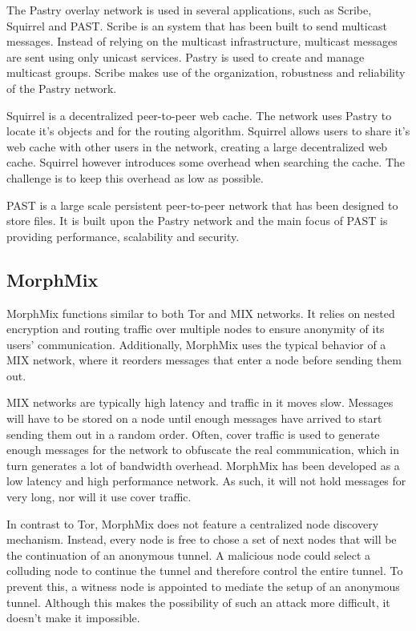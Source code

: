\documentclass{article}
\begin{document}
		The Pastry overlay network is used in several applications, such as Scribe, Squirrel and PAST. Scribe is an system that has been built to send multicast messages. Instead of relying on the multicast infrastructure, multicast messages are sent using only unicast services. Pastry is used to create and manage multicast groups. Scribe makes use of the organization, robustness and reliability of the Pastry network.

		Squirrel is a decentralized peer-to-peer web cache. The network uses Pastry to locate it's objects and for the routing algorithm. Squirrel allows users to share it's web cache with other users in the network, creating a large decentralized web cache. Squirrel however introduces some overhead when searching the cache. The challenge is to keep this overhead as low as possible.

		PAST is a large scale persistent peer-to-peer network that has been designed to store files. It is built upon the Pastry network and the main focus of PAST is providing performance, scalability and security.
			
	\subsection{MorphMix} %
		MorphMix \cite{rennhard2002introducing} functions similar to both Tor and MIX networks. It relies on nested encryption and routing traffic over multiple nodes to ensure anonymity of its users' communication. Additionally, MorphMix uses the typical behavior of a MIX network, where it reorders messages that enter a node before sending them out.
		
		MIX networks are typically high latency and traffic in it moves slow. Messages will have to be stored on a node until enough messages have arrived to start sending them out in a random order. Often, cover traffic is used to generate enough messages for the network to obfuscate the real communication, which in turn generates a lot of bandwidth overhead. MorphMix has been developed as a low latency and high performance network. As such, it will not hold messages for very long, nor will it use cover traffic.
		
		In contrast to Tor, MorphMix does not feature a centralized node discovery mechanism. Instead, every node is free to chose a set of next nodes that will be the continuation of an anonymous tunnel. A malicious node could select a colluding node to continue the tunnel and therefore control the entire tunnel. To prevent this, a witness node is appointed to mediate the setup of an anonymous tunnel. Although this makes the possibility of such an attack more difficult, it doesn't make it impossible.
		
\end{document}
